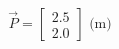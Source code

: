 \documentclass[preview]{standalone}
\begin{document}
\begin{align*}
\vec{P} = \begin{bmatrix} 2.5 \\ 2.0 \end{bmatrix} \text{ (m)}
\end{align*}
\end{document}

